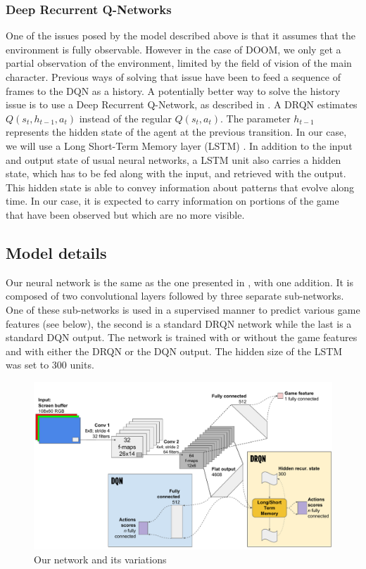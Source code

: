 \documentclass[letterpaper]{article}
\begin{document}
\subsubsection{Deep Recurrent Q-Networks}
One of the issues posed by the model described above is that it assumes that the
environment is fully observable. However in the case of DOOM, we only get a
partial
observation of the environment, limited by the field of vision of the main
character. Previous ways of solving that issue have been to feed a sequence of
frames to the DQN as a history.
A potentially better way to solve the history issue is to use a Deep Recurrent
Q-Network, as described in \citep{Hausknecht2015}. A DRQN
estimates $Q(s_t,h_{t-1},a_t)$ instead of the regular $Q(s_t,a_t)$. The
parameter $h_{t-1}$ represents the hidden state of the agent at the previous
transition. In our case, we will use a Long Short-Term Memory layer (LSTM)
\cite{Hochreiter1997}. In addition to the input and output state of usual neural
networks, a LSTM unit also carries a hidden state, which has to be fed along
with the input, and retrieved with the output. This hidden state is able to
convey information about patterns that evolve along time. In our case, it is
expected to carry information on portions of the game that have been observed
but which are no more visible.

\subsection{Model details}
Our neural network is the same as the one presented in \citep{Lample2016},
with one addition.
It is composed of two convolutional layers followed by three separate
sub-networks. One of these sub-networks is used in a supervised manner to
predict various game features (see below), the second is a standard
DRQN network while the last is a standard DQN output. The network is trained
with or without the game features and with either the DRQN or the DQN output.
The hidden size of the LSTM was set to 300 units.

\begin{figure}[h]
  \includegraphics[width=\textwidth]{DRQNSchema.pdf}
  \caption{\label{fig:drqn-schema} Our network and its variations}
\end{figure}
\end{document}
